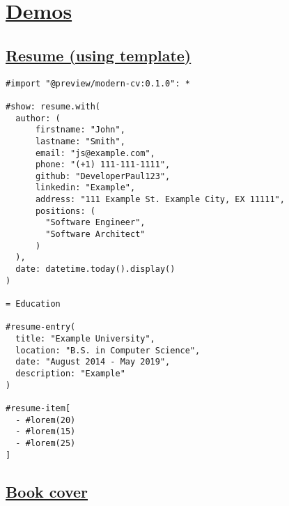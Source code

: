 \section{\texorpdfstring{\hyperref[demos]{Demos}}{Demos}}\label{demos}

\subsection{\texorpdfstring{\hyperref[resume-using-template]{Resume
(using
template)}}{Resume (using template)}}\label{resume-using-template}

\begin{verbatim}
#import "@preview/modern-cv:0.1.0": *

#show: resume.with(
  author: (
      firstname: "John", 
      lastname: "Smith",
      email: "js@example.com", 
      phone: "(+1) 111-111-1111",
      github: "DeveloperPaul123",
      linkedin: "Example",
      address: "111 Example St. Example City, EX 11111",
      positions: (
        "Software Engineer",
        "Software Architect"
      )
  ),
  date: datetime.today().display()
)

= Education

#resume-entry(
  title: "Example University",
  location: "B.S. in Computer Science",
  date: "August 2014 - May 2019",
  description: "Example"
)

#resume-item[
  - #lorem(20)
  - #lorem(15)
  - #lorem(25)
]
\end{verbatim}

\pandocbounded{}

\subsection{\texorpdfstring{\hyperref[book-cover]{Book
cover}}{Book cover}}\label{book-cover}

